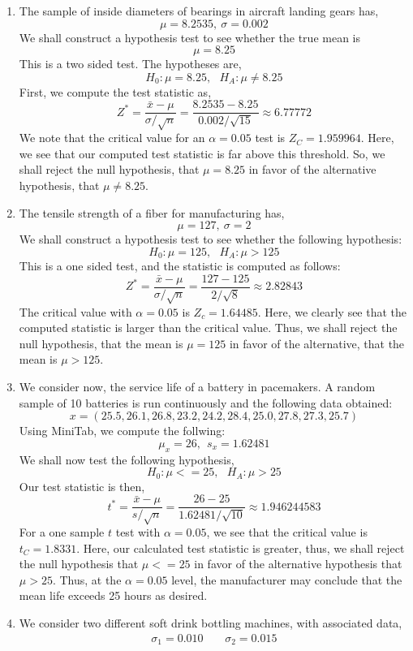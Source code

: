 \documentclass[letterpaper,10pt]{article}
\begin{document}
\begin{enumerate}
\item The sample of inside diameters of bearings in aircraft landing gears has,
\[\mu=8.2535,\ \sigma=0.002\]
We shall construct a hypothesis test to see whether the true mean is \[\mu=8.25\]
This is a two sided test. The hypotheses are,
\[H_0: \mu=8.25,\ \ \ H_A: \mu \neq 8.25\]
First, we compute the test statistic as,
\[Z^*=\frac{\bar{x}-\mu}{\sigma/\sqrt{n}}=\frac{8.2535-8.25}{0.002/\sqrt{15}}\approx 6.77772\]
We note that the critical value for an $\alpha=0.05$ test is $Z_C=1.959964$. Here, we see that our computed test statistic is far above this threshold. So, we shall reject the null hypothesis, that $\mu=8.25$ in favor of the alternative hypothesis, that $\mu\neq 8.25$.
\item The tensile strength of a fiber for manufacturing has,
\[\mu=127,\ \sigma=2\]
We shall construct a hypothesis test to see whether the following hypothesis:
\[H_0: \mu=125,\ \ \ H_A: \mu > 125\]
This is a one sided test, and the statistic is computed as follows:
\[Z^*=\frac{\bar{x}-\mu}{\sigma/\sqrt{n}}=\frac{127-125}{2/\sqrt{8}}\approx 2.82843\]
The critical value with $\alpha=0.05$ is $Z_c=1.64485$. Here, we clearly see that the computed statistic is larger than the critical value. Thus, we shall reject the null hypothesis, that the mean is $\mu=125$ in favor of the alternative, that the mean is $\mu >125$.
\item We consider now, the service life of a battery in pacemakers. A random sample of 10 batteries is run continuously and the following data obtained:
\[x=(25.5, 26.1, 26.8, 23.2, 24.2, 28.4, 25.0, 27.8, 27.3, 25.7)\]
Using MiniTab, we compute the follwing:
\[\mu_x=26,\ \ s_x=1.62481\]
We shall now test the following hypothesis,
\[H_0: \mu<= 25,\ \ \ H_A: \mu>25\]
Our test statistic is then,
\[t^*=\frac{\bar{x}-\mu}{s/\sqrt{n}}=\frac{26-25}{1.62481/\sqrt{10}}\approx 1.946244583\]
For a one sample $t$ test with $\alpha=0.05$, we see that the critical value is $t_C=1.8331$. Here, our calculated test statistic is greater, thus, we shall reject the null hypothesis that $\mu<=25$ in favor of the alternative hypothesis that $\mu>25$. Thus, at the $\alpha=0.05$ level, the manufacturer may conclude that the mean life exceeds 25 hours as desired.
\item We consider two different soft drink bottling machines, with associated data,
\begin{align*}
\sigma_1=0.010\ \ \ \ \ &\sigma_2=0.015\\

\end{align*}
\end{enumerate}
\end{document}
